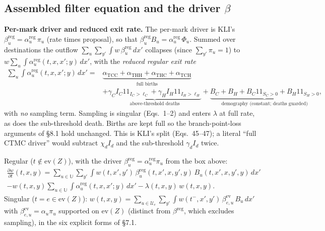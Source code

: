 \documentclass[11pt]{article}
\newcommand{\evZ}{\mathrm{ev}(Z)}
\newcommand{\ind}{1\!\!1}
\theoremstyle{plain}
\begin{document}
\subsection{Assembled filter equation and the driver $\beta$}
\begin{notebox}
\textbf{Per-mark driver and reduced exit rate.} The per-mark driver is KLI's
$\beta^{\mathrm{reg}}_u=\alpha^{\mathrm{reg}}_u\,\pi_u$ (rate times proposal), so that
$\beta^{\mathrm{reg}}_u B_u=\alpha^{\mathrm{reg}}_u\,\Phi_u$. Summed over destinations the outflow
$\sum_u\sum_{y'}\int w\,\beta^{\mathrm{reg}}_u\,dx'$ collapses (since $\sum_{y'}\pi_u=1$) to
$w\sum_u\int\alpha^{\mathrm{reg}}_u(t,x,x';y)\,dx'$, with the \emph{reduced regular exit rate}
\[
\begin{aligned}
\sum_u\int\alpha^{\mathrm{reg}}_u(t,x,x';y)\,dx'
={}&\underbrace{\alpha_{\mathrm{TCC}}+\alpha_{\mathrm{THH}}+\alpha_{\mathrm{THC}}+\alpha_{\mathrm{TCH}}}_{\text{full births}}\\
&+\underbrace{\gamma_C I_C\ind_{I_C>\ell_C}+\gamma_H I_H\ind_{I_H>\ell_H}}_{\text{above-threshold deaths}}
+\underbrace{B_C+B_H+B_C\ind_{S_C>0}+B_H\ind_{S_H>0}}_{\text{demography (constant; deaths guarded)}},
\end{aligned}
\]
with \emph{no} sampling term. Sampling is singular (Eqs.~1--2) and enters $\lambda$ at full rate, as
does the sub-threshold death. Births are kept full so the branch-point-loss arguments of \S8.1 hold
unchanged. This is KLI's split (Eqs.~45--47); a literal ``full CTMC driver'' would subtract
$\chi_d I_d$ and the sub-threshold $\gamma_d I_d$ twice.
\end{notebox}
Regular ($t\notin\evZ$), with the driver $\beta^{\mathrm{reg}}_u=\alpha^{\mathrm{reg}}_u\pi_u$ from the box above:
\begin{multline*}
\frac{\partial w}{\partial t}(t,x,y)=\sum_{u\in\mathbb U}\sum_{y'}\int w(t,x',y')\,\beta^{\mathrm{reg}}_u(t,x',x,y',y)\,B_u(t,x',x,y',y)\,dx'\\
-w(t,x,y)\sum_{u\in\mathbb U}\int\alpha^{\mathrm{reg}}_u(t,x,x';y)\,dx'-\lambda(t,x,y)\,w(t,x,y).
\end{multline*}
Singular ($t=e\in\evZ$): $\displaystyle w(t,x,y)=\sum_{u\in\mathcal U_e}\sum_{y'}\int w(t^-,x',y')\,
\beta^{\mathrm{ev}}_{e,u}\,B_u\,dx'$ with $\beta^{\mathrm{ev}}_{e,u}=\alpha_u\pi_u$ supported on $\evZ$
(distinct from $\beta^{\mathrm{reg}}$, which excludes sampling), in the six explicit forms of \S7.1.
\end{document}
